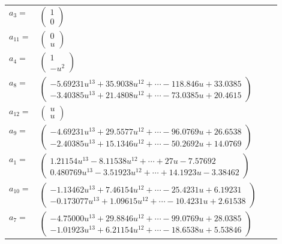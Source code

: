 \documentclass[1p]{elsarticle_modified}
\theoremstyle{definition}
\begin{document}
\begin{tabular}{m{7pt} m{180pt} m{7pt} m{180pt} }
\flushright $a_{3}=$&$\begin{pmatrix}1\\0\end{pmatrix}$ \\
\flushright $a_{11}=$&$\begin{pmatrix}0\\u\end{pmatrix}$ \\
\flushright $a_{4}=$&$\begin{pmatrix}1\\- u^2\end{pmatrix}$ \\
\flushright $a_{8}=$&$\begin{pmatrix}-5.69231 u^{13}+35.9038 u^{12}+\cdots-118.846 u+33.0385\\-3.40385 u^{13}+21.4808 u^{12}+\cdots-73.0385 u+20.4615\end{pmatrix}$ \\
\flushright $a_{12}=$&$\begin{pmatrix}u\\u\end{pmatrix}$ \\
\flushright $a_{9}=$&$\begin{pmatrix}-4.69231 u^{13}+29.5577 u^{12}+\cdots-96.0769 u+26.6538\\-2.40385 u^{13}+15.1346 u^{12}+\cdots-50.2692 u+14.0769\end{pmatrix}$ \\
\flushright $a_{1}=$&$\begin{pmatrix}1.21154 u^{13}-8.11538 u^{12}+\cdots+27 u-7.57692\\0.480769 u^{13}-3.51923 u^{12}+\cdots+14.1923 u-3.38462\end{pmatrix}$ \\
\flushright $a_{10}=$&$\begin{pmatrix}-1.13462 u^{13}+7.46154 u^{12}+\cdots-25.4231 u+6.19231\\-0.173077 u^{13}+1.09615 u^{12}+\cdots-10.4231 u+2.61538\end{pmatrix}$ \\
\flushright $a_{7}=$&$\begin{pmatrix}-4.75000 u^{13}+29.8846 u^{12}+\cdots-99.0769 u+28.0385\\-1.01923 u^{13}+6.21154 u^{12}+\cdots-18.6538 u+5.53846\end{pmatrix}$ \\

\end{tabular}
\end{document}
